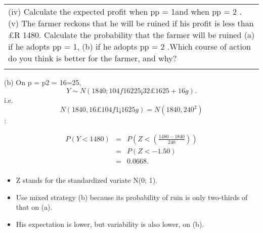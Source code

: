 \documentclass[a4paper,12pt]{article}
\begin{document}
\begin{enumerate}[(a)]
  \begin{table}[ht!]
     \centering
     \begin{tabular}{|p{15cm}|}
     \hline  
(iv) Calculate the expected profit when pp = 1and when pp = 2 .
(v) The farmer reckons that he will be ruined if his profit is less than £R 1480. Calculate the probability that the farmer will be ruined (a) if he adopts pp = 1, (b) if he adopts pp = 2 .Which course of action do you think is better for the farmer, and why?\\\\ \hline
      \end{tabular}
    \end{table}
(b) On p = p2 = 16=25, 
\[Y \sim N(1840; 104f162
25 ¡ 32£16
25 + 16g).\]
i.e. \[N(1840, 16 £ 104f1 ¡ 16
25g) = N(1840, 240^2)\]:


\begin{eqnarray*}
P(Y < 1480) &=& P\left(Z < \left( \frac{1480-1840}{240} \right)
\right) \\
&=& P(Z < -1.50)\\ 
&=& 0.0668.\\
\end{eqnarray*}

\begin{itemize}
    \item Z stands for the standardized variate N(0; 1).
    \item Use mixed strategy (b) because
its probability of ruin is only two-thirds of that on (a).
\item His expectation
is lower, but variability is also lower, on (b).
\end{itemize}

\end{enumerate}
\end{document}
